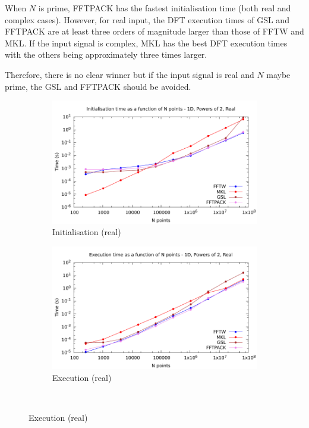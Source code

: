 \documentclass[12pt, a4paper]{article} \setlength{\textheight}{24cm}
\begin{document}
When $N$ is prime, FFTPACK has the fastest initialisation time (both
real and complex cases). However, for real input, the DFT execution
times of GSL and FFTPACK are at least three orders of magnitude larger
than those of FFTW and MKL. If the input signal is complex, MKL has
the best DFT execution times with the others being approximately three
times larger.


Therefore, there is no clear winner but if the input signal is real
and $N$ maybe prime, the GSL and FFTPACK should be avoided.


\begin{figure}[H]
  \captionsetup{width=0.8\linewidth}
  \centering
  \begin{subfigure}{.5\textwidth}
    \centering
    \includegraphics[width=.9\linewidth]{graphs/1d-pow2-init-r.pdf}
    \caption{Initialisation (real)}
    \label{1DPOW2RI}
  \end{subfigure}%
  \begin{subfigure}{.5\textwidth}
    \centering
    \includegraphics[width=.9\linewidth]{graphs/1d-pow2-exec-r.pdf}
    \caption{Execution (real)}
    \label{1DPOW2R}
  \end{subfigure}\\

\end{figure}
\end{document}
